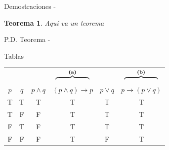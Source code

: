\documentclass[11pt,letterpaper]{article}
\newtheorem{teorema}{Teorema}
\begin{document}
\begin{intro}
    \lipsum[2]
\end{intro}


\begin{inciso}{Demostraciones}
- \lipsum[4] 

\begin{teorema}
Aquí va un teorema
\end{teorema}

\begin{demostracion}{P.D. Teorema }
- \lipsum[4] 
\end{demostracion}
\end{inciso}


\begin{inciso}{Tablas}
-    \lipsum[4]


\begin{table}[H]
    \centering
    \begin{tabular}{c*{5}{|c}}
    &
    &&
    \\[-1ex]
    $p$ & $q$ & $p\land q$ & $(p\land q)\to p$ & $p\lor q$ & $p\to (p\lor q)$\\
    \hline
    T & T & T & T & T & T\\
    T & F & F & T & T & T\\
    F & T & F & T & T & T\\
    F & F & F & T & F & T
    \end{tabular}
    \label{tab:logica}
    \end{table}

\end{inciso}
\end{document}
